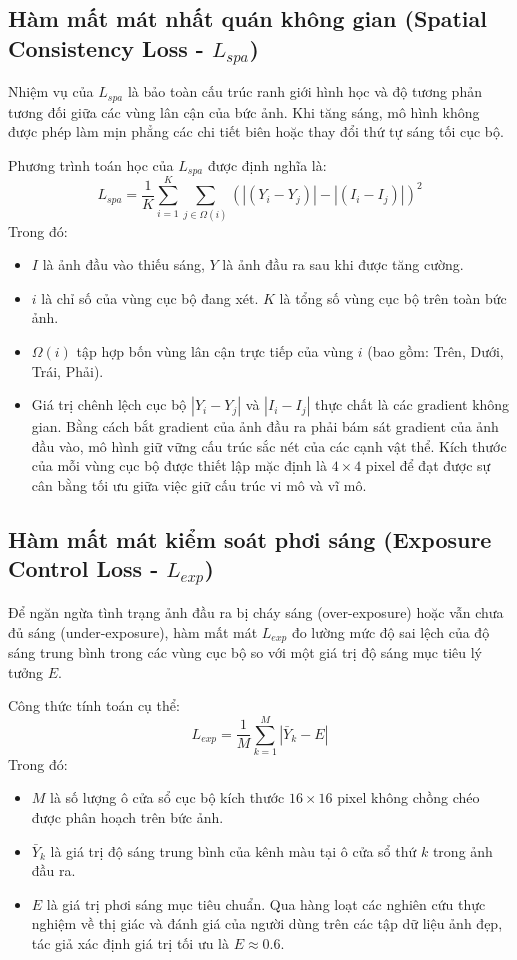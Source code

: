 \documentclass[a4paper]{article}
\begin{document}
\subsection{Hàm mất mát nhất quán không gian (Spatial Consistency Loss - $L_{spa}$)}
Nhiệm vụ của $L_{spa}$ là bảo toàn cấu trúc ranh giới hình học và độ tương phản tương đối giữa các vùng lân cận của bức ảnh. Khi tăng sáng, mô hình không được phép làm mịn phẳng các chi tiết biên hoặc thay đổi thứ tự sáng tối cục bộ.

Phương trình toán học của $L_{spa}$ được định nghĩa là:
\begin{equation}
    L_{spa} = \frac{1}{K} \sum_{i=1}^{K} \sum_{j \in \Omega(i)} \left( |(Y_i - Y_j)| - |(I_i - I_j)| \right)^2
\end{equation}
Trong đó:
\begin{itemize}
    \item $I$ là ảnh đầu vào thiếu sáng, $Y$ là ảnh đầu ra sau khi được tăng cường.
    \item $i$ là chỉ số của vùng cục bộ đang xét. $K$ là tổng số vùng cục bộ trên toàn bức ảnh.
    \item $\Omega(i)$ tập hợp bốn vùng lân cận trực tiếp của vùng $i$ (bao gồm: Trên, Dưới, Trái, Phải).
    \item Giá trị chênh lệch cục bộ $|Y_i - Y_j|$ và $|I_i - I_j|$ thực chất là các gradient không gian. Bằng cách bắt gradient của ảnh đầu ra phải bám sát gradient của ảnh đầu vào, mô hình giữ vững cấu trúc sắc nét của các cạnh vật thể. Kích thước của mỗi vùng cục bộ được thiết lập mặc định là $4 \times 4$ pixel để đạt được sự cân bằng tối ưu giữa việc giữ cấu trúc vi mô và vĩ mô.
\end{itemize}

\subsection{Hàm mất mát kiểm soát phơi sáng (Exposure Control Loss - $L_{exp}$)}
Để ngăn ngừa tình trạng ảnh đầu ra bị cháy sáng (over-exposure) hoặc vẫn chưa đủ sáng (under-exposure), hàm mất mát $L_{exp}$ đo lường mức độ sai lệch của độ sáng trung bình trong các vùng cục bộ so với một giá trị độ sáng mục tiêu lý tưởng $E$.

Công thức tính toán cụ thể:
\begin{equation}
    L_{exp} = \frac{1}{M} \sum_{k=1}^{M} | \bar{Y}_k - E |
\end{equation}
Trong đó:
\begin{itemize}
    \item $M$ là số lượng ô cửa sổ cục bộ kích thước $16 \times 16$ pixel không chồng chéo được phân hoạch trên bức ảnh.
    \item $\bar{Y}_k$ là giá trị độ sáng trung bình của kênh màu tại ô cửa sổ thứ $k$ trong ảnh đầu ra.
    \item $E$ là giá trị phơi sáng mục tiêu chuẩn. Qua hàng loạt các nghiên cứu thực nghiệm về thị giác và đánh giá của người dùng trên các tập dữ liệu ảnh đẹp, tác giả xác định giá trị tối ưu là $E \approx 0.6$. 
\end{itemize}
\end{document}
